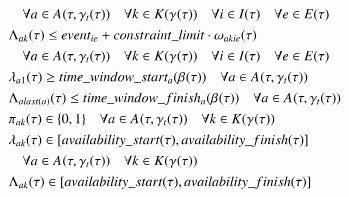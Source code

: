 {\begin{alignat}{2}
		& \quad \forall \ElementActivity \in \SetActivity{\VarSupervisorAssignment{}{\ElementTechnician}}{}  \quad\forall \ElementWorkSegment \in \SetWorkSegment                                           \quad \forall i \in \SetTimeInstance  \quad\forall \ElementEvent \in \SetEvent                                                                                                                         \\
		& \VarFinishOfSegment{\ElementActivity}{\ElementWorkSegment} \leq \ParEvent + \ParConstraintLimit \cdot \VarSegmentInRelation \notag\\
		& \quad \forall \ElementActivity \in \SetActivity{\VarSupervisorAssignment{}{\ElementTechnician}}{}  \quad\forall \ElementWorkSegment \in \SetWorkSegment                                         \quad \forall i \in \SetTimeInstance  \quad\forall \ElementEvent \in \SetEvent                                                                                                                         \\
		& \VarStartOfSegment{\ElementActivity}{1} \geq \ParTimeWindowStart  \quad \forall \ElementActivity \in \SetActivity{\VarSupervisorAssignment{}{\ElementTechnician}}{}                                                                                                      \\
		& \VarFinishOfSegment{\ElementActivity}{last(\ElementActivity)} \leq \ParTimeWindowFinish  \quad \forall \ElementActivity \in \SetActivity{\VarSupervisorAssignment{}{\ElementTechnician}}{}                                                                                                      \\
		& \VarActiveSegment{\ElementActivity}{\ElementWorkSegment} \in \{0, 1\}  \quad \forall \ElementActivity \in \SetActivity{\VarSupervisorAssignment{}{\ElementTechnician}}{} \quad \forall \ElementWorkSegment \in \SetWorkSegment                                                \\
		& \VarStartOfSegment{\ElementActivity}{\ElementWorkSegment} \in [\ParAvailabilityStart, \ParAvailabilityFinish]                                                                                                           \notag\\
		& \quad \forall \ElementActivity \in \SetActivity{\VarSupervisorAssignment{}{\ElementTechnician}}{} \quad \forall \ElementWorkSegment \in \SetWorkSegment                                                \\
		& \VarFinishOfSegment{\ElementActivity}{\ElementWorkSegment} \in [\ParAvailabilityStart, \ParAvailabilityFinish]                                                                                                             \notag\\

\end{alignat}}
